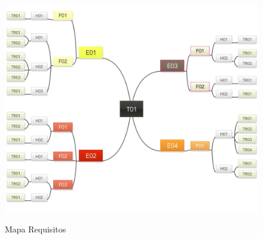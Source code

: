\FloatBarrier
\begin{figure}[!htpd]
		\centering
		\includegraphics[scale=0.27]{figuras/T01}
		\label{img:SAF}
		\caption{Mapa Requisitos}
\end{figure}
\FloatBarrier
